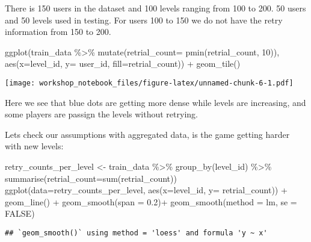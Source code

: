 \documentclass[
]{article}
\newenvironment{Shaded}{\begin{snugshade}}{\end{snugshade}}
\newcommand{\AttributeTok}[1]{\textcolor[rgb]{0.77,0.63,0.00}{#1}}
\newcommand{\ConstantTok}[1]{\textcolor[rgb]{0.00,0.00,0.00}{#1}}
\newcommand{\DecValTok}[1]{\textcolor[rgb]{0.00,0.00,0.81}{#1}}
\newcommand{\FloatTok}[1]{\textcolor[rgb]{0.00,0.00,0.81}{#1}}
\newcommand{\FunctionTok}[1]{\textcolor[rgb]{0.00,0.00,0.00}{#1}}
\newcommand{\NormalTok}[1]{#1}
\newcommand{\OtherTok}[1]{\textcolor[rgb]{0.56,0.35,0.01}{#1}}
\newcommand{\SpecialCharTok}[1]{\textcolor[rgb]{0.00,0.00,0.00}{#1}}
\begin{document}
There is 150 users in the dataset and 100 levels ranging from 100 to
200. 50 users and 50 levels used in testing. For users 100 to 150 we do
not have the retry information from 150 to 200.

\begin{Shaded}
\begin{Highlighting}[]
\FunctionTok{ggplot}\NormalTok{(train\_data }\SpecialCharTok{\%\textgreater{}\%} \FunctionTok{mutate}\NormalTok{(}\AttributeTok{retrial\_count=} \FunctionTok{pmin}\NormalTok{(retrial\_count, }\DecValTok{10}\NormalTok{)), }\FunctionTok{aes}\NormalTok{(}\AttributeTok{x=}\NormalTok{level\_id, }\AttributeTok{y=}\NormalTok{ user\_id, }\AttributeTok{fill=}\NormalTok{retrial\_count)) }\SpecialCharTok{+} 
  \FunctionTok{geom\_tile}\NormalTok{()}
\end{Highlighting}
\end{Shaded}

\texttt{[image: workshop\_notebook\_files/figure-latex/unnamed-chunk-6-1.pdf]}

Here we see that blue dots are getting more dense while levels are
increasing, and some players are passign the levels without retrying.

Lets check our assumptions with aggregated data, is the game getting
harder with new levels:

\begin{Shaded}
\begin{Highlighting}[]
\NormalTok{retry\_counts\_per\_level }\OtherTok{\textless{}{-}}\NormalTok{ train\_data }\SpecialCharTok{\%\textgreater{}\%} \FunctionTok{group\_by}\NormalTok{(level\_id) }\SpecialCharTok{\%\textgreater{}\%} \FunctionTok{summarise}\NormalTok{(}\AttributeTok{retrial\_count=}\FunctionTok{sum}\NormalTok{(retrial\_count))}
\FunctionTok{ggplot}\NormalTok{(}\AttributeTok{data=}\NormalTok{retry\_counts\_per\_level, }\FunctionTok{aes}\NormalTok{(}\AttributeTok{x=}\NormalTok{level\_id, }\AttributeTok{y=}\NormalTok{ retrial\_count)) }\SpecialCharTok{+} 
  \FunctionTok{geom\_line}\NormalTok{() }\SpecialCharTok{+}
  \FunctionTok{geom\_smooth}\NormalTok{(}\AttributeTok{span =} \FloatTok{0.2}\NormalTok{)}\SpecialCharTok{+}
  \FunctionTok{geom\_smooth}\NormalTok{(}\AttributeTok{method =}\NormalTok{ lm, }\AttributeTok{se =} \ConstantTok{FALSE}\NormalTok{)}
\end{Highlighting}
\end{Shaded}

\begin{verbatim}
## `geom_smooth()` using method = 'loess' and formula 'y ~ x'
\end{verbatim}
\end{document}
